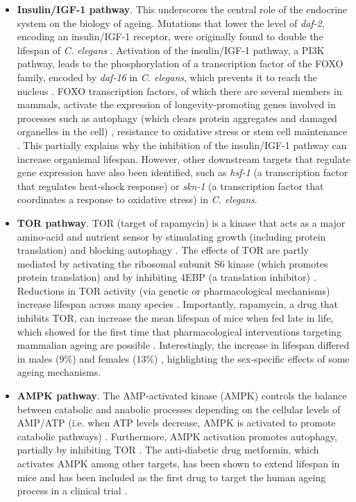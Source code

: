 \begin{itemize} 

	\item \textbf{Insulin/\acrshort{IGF-1} pathway}. This underscores the central role of the endocrine system on the biology of ageing. Mutations that lower the level of \textit{daf-2}, encoding an insulin/IGF-1 receptor, were originally found to double the lifespan of \textit{C. elegans} \cite{Kenyon1993,Guarente2000}. Activation of the insulin/IGF-1 pathway, a PI3K pathway, leads to the phosphorylation of a transcription factor of the FOXO family, encoded by \textit{daf-16} in \textit{C. elegans}, which prevents it to reach the nucleus \cite{Lin2001}. FOXO transcription factors, of which there are several members in mammals, activate the expression of longevity-promoting genes involved in processes such as autophagy (which clears protein aggregates and damaged organelles in the cell) \cite{Singh2019}, resistance to oxidative stress or stem cell maintenance \cite{Martins2016}. This partially explains why the inhibition of the insulin/IGF-1 pathway can increase organismal lifespan. However, other downstream targets that regulate gene expression have also been identified, such as \textit{hsf-1} (a transcription factor that regulates heat-shock response) \cite{Hsu2003} or \textit{skn-1} (a transcription factor that coordinates a response to oxidative stress) \cite{Tullet2008} in \textit{C. elegans}.
	
	\item \textbf{\acrshort{TOR} pathway}. \acrshort{TOR} (target of rapamycin) is a kinase that acts as a major amino-acid and nutrient sensor by stimulating growth (including protein translation) and blocking autophagy \cite{Kenyon2010}. The effects of TOR are partly mediated by activating the ribosomal subunit S6 kinase (which promotes protein translation) and by inhibiting 4EBP (a translation inhibitor)  \cite{Kenyon2010,Um2006}. Reductions in TOR activity (via genetic or pharmacological mechanisms) increase lifespan across many species \cite{Kenyon2010}. Importantly, rapamycin, a drug that inhibits TOR, can increase the mean lifespan of mice when fed late in life, which showed for the first time that pharmacological interventions targeting mammalian ageing are possible \cite{Harrison2009}. Interestingly, the increase in lifespan differed in males (9\%) and females (13\%) \cite{Harrison2009}, highlighting the sex-specific effects of some ageing mechanisms. 
	
	\item \textbf{AMPK pathway}. The AMP-activated kinase (\acrshort{AMPK}) controls the balance between catabolic and anabolic processes depending on the cellular levels of \acrshort{AMP}/\acrshort{ATP} (i.e. when ATP levels decrease, AMPK is activated to promote catabolic pathways) \cite{Kenyon2010,Mihaylova2011}. Furthermore, AMPK activation promotes autophagy, partially by inhibiting TOR \cite{Mihaylova2011}. The anti-diabetic drug metformin, which activates AMPK among other targets, has been shown to extend lifespan in mice \cite{Anisimov2008,Martin-Montalvo2013} and has been included as the first drug to target the human ageing process in a clinical trial \cite{Barzilai2016}.
		

\end{itemize}
